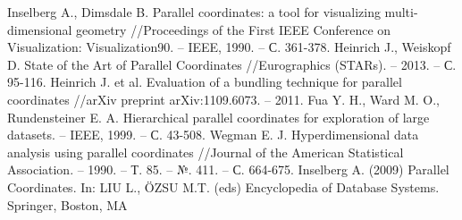 \documentclass[12pt,fleqn]{article}
\begin{document}
\newpage

\begin{thebibliography}{99}
     Inselberg A., Dimsdale B. Parallel coordinates: 
    a tool for visualizing multi-dimensional geometry 
    //Proceedings of the First IEEE Conference on Visualization: 
    Visualization90. – IEEE, 1990. – С. 361-378.
     Heinrich J., Weiskopf D. State of the Art of Parallel Coordinates 
    //Eurographics (STARs). – 2013. – С. 95-116.
     Heinrich J. et al. Evaluation of a bundling technique for parallel coordinates 
    //arXiv preprint arXiv:1109.6073. – 2011.
     Fua Y. H., Ward M. O., Rundensteiner E. A. Hierarchical parallel coordinates
     for exploration of large datasets. – IEEE, 1999. – С. 43-508.
      Wegman E. J. Hyperdimensional data analysis using parallel coordinates 
     //Journal of the American Statistical Association. – 1990. – Т. 85. – №. 411. – С. 664-675. 
      Inselberg A. (2009) Parallel Coordinates. In: LIU L., ÖZSU M.T. (eds)
      Encyclopedia of Database Systems. Springer, Boston, MA
\end{thebibliography}
\end{document}
